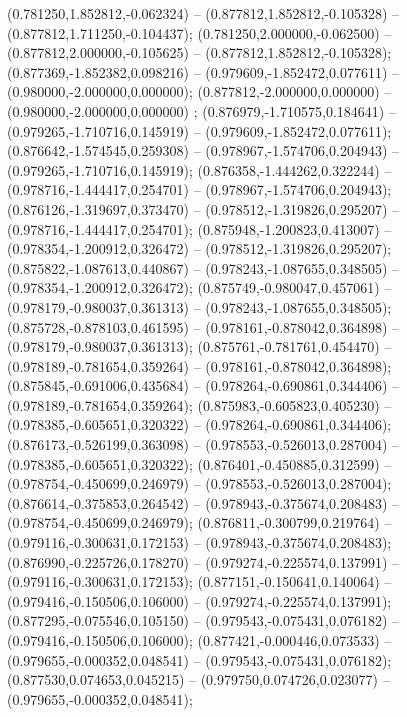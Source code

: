  (0.781250,1.852812,-0.062324) -- (0.877812,1.852812,-0.105328) -- (0.877812,1.711250,-0.104437);
 (0.781250,2.000000,-0.062500) -- (0.877812,2.000000,-0.105625) -- (0.877812,1.852812,-0.105328);
 (0.877369,-1.852382,0.098216) -- (0.979609,-1.852472,0.077611) -- (0.980000,-2.000000,0.000000);
 (0.877812,-2.000000,0.000000) -- (0.980000,-2.000000,0.000000) ;
 (0.876979,-1.710575,0.184641) -- (0.979265,-1.710716,0.145919) -- (0.979609,-1.852472,0.077611);
 (0.876642,-1.574545,0.259308) -- (0.978967,-1.574706,0.204943) -- (0.979265,-1.710716,0.145919);
 (0.876358,-1.444262,0.322244) -- (0.978716,-1.444417,0.254701) -- (0.978967,-1.574706,0.204943);
 (0.876126,-1.319697,0.373470) -- (0.978512,-1.319826,0.295207) -- (0.978716,-1.444417,0.254701);
 (0.875948,-1.200823,0.413007) -- (0.978354,-1.200912,0.326472) -- (0.978512,-1.319826,0.295207);
 (0.875822,-1.087613,0.440867) -- (0.978243,-1.087655,0.348505) -- (0.978354,-1.200912,0.326472);
 (0.875749,-0.980047,0.457061) -- (0.978179,-0.980037,0.361313) -- (0.978243,-1.087655,0.348505);
 (0.875728,-0.878103,0.461595) -- (0.978161,-0.878042,0.364898) -- (0.978179,-0.980037,0.361313);
 (0.875761,-0.781761,0.454470) -- (0.978189,-0.781654,0.359264) -- (0.978161,-0.878042,0.364898);
 (0.875845,-0.691006,0.435684) -- (0.978264,-0.690861,0.344406) -- (0.978189,-0.781654,0.359264);
 (0.875983,-0.605823,0.405230) -- (0.978385,-0.605651,0.320322) -- (0.978264,-0.690861,0.344406);
 (0.876173,-0.526199,0.363098) -- (0.978553,-0.526013,0.287004) -- (0.978385,-0.605651,0.320322);
 (0.876401,-0.450885,0.312599) -- (0.978754,-0.450699,0.246979) -- (0.978553,-0.526013,0.287004);
 (0.876614,-0.375853,0.264542) -- (0.978943,-0.375674,0.208483) -- (0.978754,-0.450699,0.246979);
 (0.876811,-0.300799,0.219764) -- (0.979116,-0.300631,0.172153) -- (0.978943,-0.375674,0.208483);
 (0.876990,-0.225726,0.178270) -- (0.979274,-0.225574,0.137991) -- (0.979116,-0.300631,0.172153);
 (0.877151,-0.150641,0.140064) -- (0.979416,-0.150506,0.106000) -- (0.979274,-0.225574,0.137991);
 (0.877295,-0.075546,0.105150) -- (0.979543,-0.075431,0.076182) -- (0.979416,-0.150506,0.106000);
 (0.877421,-0.000446,0.073533) -- (0.979655,-0.000352,0.048541) -- (0.979543,-0.075431,0.076182);
 (0.877530,0.074653,0.045215) -- (0.979750,0.074726,0.023077) -- (0.979655,-0.000352,0.048541);

